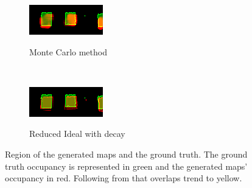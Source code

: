 \begin{figure}[htbp]
	\centering
	\begin{subfigure}[t]{0.45\textwidth}
		\includegraphics[scale=1.5]{figures/static_mapping/color_diff_monte_carlo}		
		\label{fig:monte_carlo_mapsec1}
		\caption{Monte Carlo method}
	\end{subfigure}
	~ %
	\begin{subfigure}[t]{0.45\textwidth}
		\includegraphics[scale=1.5]{figures/static_mapping/color_diff_ideal_decay}
		\label{fig:ideal_deacy_mapsec1}
		\caption{Reduced Ideal with decay}
	\end{subfigure}
	\caption{Region of the generated maps and the ground truth. The ground truth occupancy is represented in green and the generated maps' occupancy in red. Following from that overlaps trend to yellow.}
	\label{fig:box_region_comparison}
\end{figure}

